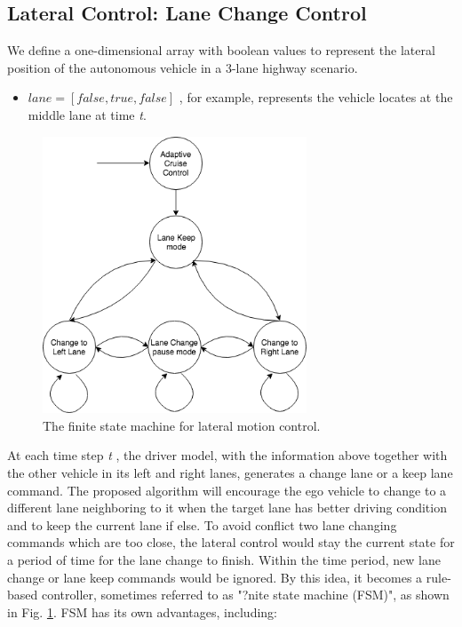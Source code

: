 \subsection{Lateral Control: Lane Change Control}

We define a one-dimensional array with boolean values to represent the lateral position of the autonomous vehicle in a 3-lane highway scenario.

\begin{itemize}
\item $lane = [false, true, false]$ , for example, represents the vehicle locates at the middle lane at time \textit{t}.
\end{itemize}

\begin{figure}[h]
\centering
\includegraphics[width=0.7\textwidth]{figs/ch3/state-machine}
\caption{The finite state machine for lateral motion control.}
\label{fig:fsm}
\end{figure}

At each time step \textit{t} , the driver model, with the information above together with the other vehicle in its left and right lanes, generates a change lane or a keep lane command. The proposed algorithm will encourage the ego vehicle to change to a different lane neighboring to it when the target lane has better driving condition and to keep the current lane if else. To avoid conflict two lane changing commands which are too close, the lateral control would stay the current state for a period of time for the lane change to finish. Within the time period, new lane change or lane keep commands would be ignored. By this idea, it becomes a rule-based controller, sometimes referred to as "?nite state machine (FSM)", as shown in Fig. \ref{fig:fsm}. FSM has its own advantages, including:

